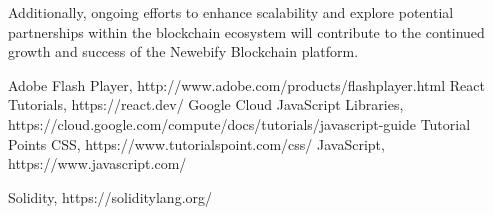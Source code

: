 \documentclass[12pt,a4paper]{article}
\begin{document}
Additionally, ongoing efforts to enhance scalability and explore potential partnerships within the blockchain ecosystem will contribute to the continued growth and success of the Newebify Blockchain platform.
\newpage
\begin{thebibliography}{1}

   Adobe Flash Player, http://www.adobe.com/products/flashplayer.html
    React Tutorials, https://react.dev/
   Google Cloud JavaScript Libraries, https://cloud.google.com/compute/docs/tutorials/javascript-guide
   Tutorial Points CSS, https://www.tutorialspoint.com/css/
   JavaScript, https://www.javascript.com/

  Solidity, https://soliditylang.org/



  \end{thebibliography}
\end{document}
